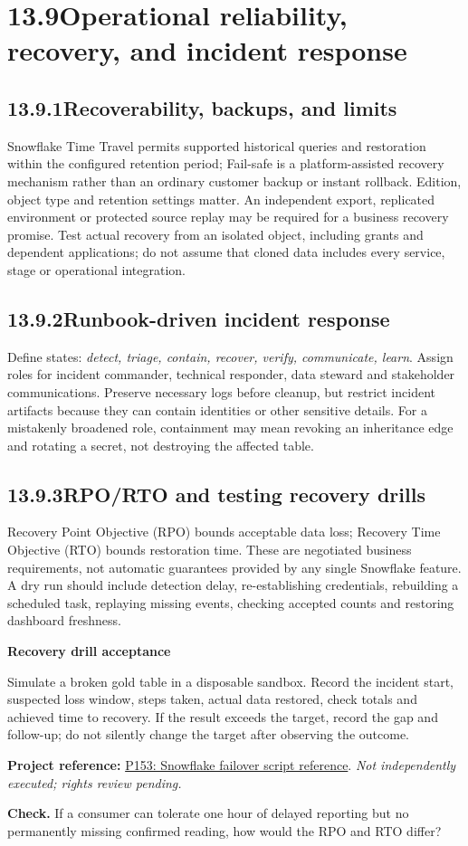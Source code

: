 \documentclass[11pt,twoside]{article}
\newcommand{\topic}[2]{\subsection*{#1\quad #2}}
\newcommand{\repo}[2]{\par\begingroup\fontsize{8.0}{9.6}\selectfont\sffamily\color{inkgray}\textbf{Project reference:} \href{#2}{#1}. \textit{Not independently executed; rights review pending.}\par\endgroup}
\begin{document}
\section*{13.9\quad Operational reliability, recovery, and incident response}
\topic{13.9.1}{Recoverability, backups, and limits}
Snowflake Time Travel permits supported historical queries and restoration within the configured retention period; Fail-safe is a platform-assisted recovery mechanism rather than an ordinary customer backup or instant rollback. Edition, object type and retention settings matter. An independent export, replicated environment or protected source replay may be required for a business recovery promise. Test actual recovery from an isolated object, including grants and dependent applications; do not assume that cloned data includes every service, stage or operational integration.
\topic{13.9.2}{Runbook-driven incident response}
Define states: \emph{detect, triage, contain, recover, verify, communicate, learn}. Assign roles for incident commander, technical responder, data steward and stakeholder communications. Preserve necessary logs before cleanup, but restrict incident artifacts because they can contain identities or other sensitive details. For a mistakenly broadened role, containment may mean revoking an inheritance edge and rotating a secret, not destroying the affected table.
\topic{13.9.3}{RPO/RTO and testing recovery drills}
Recovery Point Objective (RPO) bounds acceptable data loss; Recovery Time Objective (RTO) bounds restoration time. These are negotiated business requirements, not automatic guarantees provided by any single Snowflake feature. A dry run should include detection delay, re-establishing credentials, rebuilding a scheduled task, replaying missing events, checking accepted counts and restoring dashboard freshness.
\begin{whitebox}\textbf{Recovery drill acceptance}\par
Simulate a broken gold table in a disposable sandbox. Record the incident start, suspected loss window, steps taken, actual data restored, check totals and achieved time to recovery. If the result exceeds the target, record the gap and follow-up; do not silently change the target after observing the outcome.
\end{whitebox}
\repo{P153: Snowflake failover script reference}{https://github.com/Snowflake-Labs/sfguide_failover_scripts}
\textbf{Check.} If a consumer can tolerate one hour of delayed reporting but no permanently missing confirmed reading, how would the RPO and RTO differ?
\newpage
\end{document}
